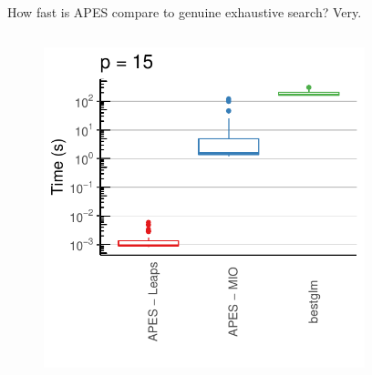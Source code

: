 \documentclass[12pt,aspectratio=169]{beamer}
\begin{document}
\begin{frame}{How fast is APES compare to genuine exhaustive search?} 
Very. 
%	

\begin{columns}
	\begin{column}{0.5\linewidth}
		\begin{figure}
			\centering
			\includegraphics[width=\linewidth]{goldStandardTimePlot_EcoSta_2019_Jun_24}
		\end{figure}
	\end{column}
	\begin{column}{0.5\linewidth}
		\begin{figure}
			\centering
\end{figure}
\end{column}
\end{columns}
\end{frame}
\end{document}
